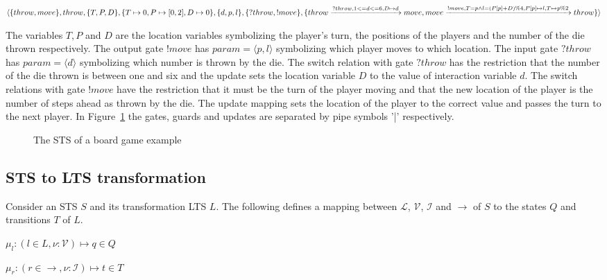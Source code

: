 $\langle\{throw, move\},throw,\{T, P, D\},\{T \mapsto 0, P \mapsto [0, 2], D \mapsto 0\},\{d, p, l\},\{?throw, !move\},\\
\{throw\xrightarrow{?throw, 1 <= d <= 6, D \mapsto d}move, move\xrightarrow{!move, T=p \land l=(P[p]+D)\%4, P[p] \mapsto l, T \mapsto p\%2}throw\}\rangle$

The variables $T, P$ and $D$ are the location variables symbolizing the player's turn, the positions of the players and the number of the die thrown respectively. The output gate $!move$ has $param = \langle p, l\rangle$ symbolizing which player moves to which location. The input gate $?throw$ has $param = \langle d\rangle$ symbolizing which number is thrown by the die. The switch relation with gate $?throw$ has the restriction that the number of the die thrown is between one and six and the update sets the location variable $D$ to the value of interaction variable $d$. The switch relations with gate $!move$ have the restriction that it must be the turn of the player moving and that the new location of the player is the number of steps ahead as thrown by the die. The update mapping sets the location of the player to the correct value and passes the turn to the next player. In Figure~\ref{fig:example_sts} the gates, guards and updates are separated by pipe symbols '|' respectively.

\begin{figure}[ht]
  \begin{center}
    
  \end{center}
  \caption{The STS of a board game example}
  \label{fig:example_sts}
\end{figure}

\subsection{STS to LTS transformation}\label{sec:sts_lts_trafo}
Consider an STS $S$ and its transformation LTS $L$. The following defines a mapping between $\mathcal{L}$, $\mathcal{V}$, $\mathcal{I}$ and $\rightarrow$ of $S$ to the states $Q$ and transitions $T$ of $L$.

\begin{definition}
  \item $\mu_l:(l \in L, \nu:\mathcal{V}) \mapsto q \in Q$
  \item $\mu_r:(r \in \rightarrow, \nu:\mathcal{I}) \mapsto t \in T$
\end{definition}

